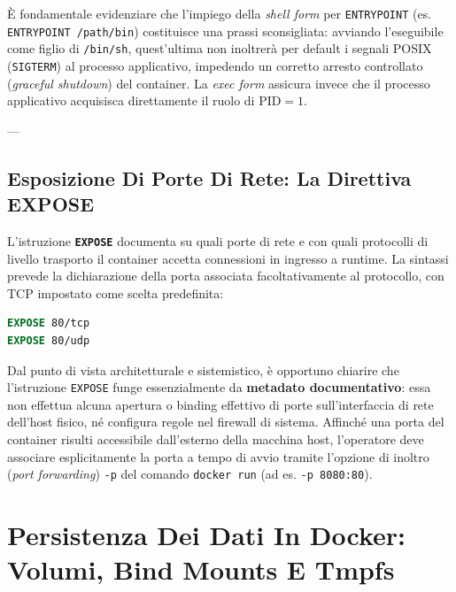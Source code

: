 \documentclass[11pt, a4paper]{article}
\begin{document}
È fondamentale evidenziare che l'impiego della \emph{shell form} per \texttt{ENTRYPOINT} (es. \texttt{ENTRYPOINT /path/bin}) costituisce una prassi sconsigliata: avviando l'eseguibile come figlio di \texttt{/bin/sh}, quest'ultima non inoltrerà per default i segnali POSIX (\texttt{SIGTERM}) al processo applicativo, impedendo un corretto arresto controllato (\emph{graceful shutdown}) del container. La \emph{exec form} assicura invece che il processo applicativo acquisisca direttamente il ruolo di $\text{PID} = 1$.

---

\subsection{Esposizione Di Porte Di Rete: La Direttiva EXPOSE}

L'istruzione \textbf{\texttt{EXPOSE}} documenta su quali porte di rete e con quali protocolli di livello trasporto il container accetta connessioni in ingresso a runtime.
La sintassi prevede la dichiarazione della porta associata facoltativamente al protocollo, con TCP impostato come scelta predefinita:
\begin{lstlisting}[language=dockerfile]
EXPOSE 80/tcp
EXPOSE 80/udp
\end{lstlisting}

Dal punto di vista architetturale e sistemistico, è opportuno chiarire che l'istruzione \texttt{EXPOSE} funge essenzialmente da \textbf{metadato documentativo}: essa non effettua alcuna apertura o binding effettivo di porte sull'interfaccia di rete dell'host fisico, né configura regole nel firewall di sistema. Affinché una porta del container risulti accessibile dall'esterno della macchina host, l'operatore deve associare esplicitamente la porta a tempo di avvio tramite l'opzione di inoltro (\emph{port forwarding}) \texttt{-p} del comando \texttt{docker run} (ad es. \texttt{-p 8080:80}).

\newpage


\section{Persistenza Dei Dati In Docker: Volumi, Bind Mounts E Tmpfs}
\end{document}
